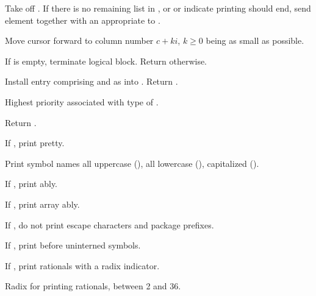\begin{LIST}{1cm}
  \begin{LIST}{.5cm}

    Take  off . If there is no remaining
    list in , or  or  indicate
    printing should end, send element together with an appropriate to
    . 

    Move cursor forward to column number $c + ki$, $k \geq 0$ being as small
    as possible.

    If  is empty, terminate logical block. Return
    \retval{\NIL} otherwise.

  \end{LIST}


  Install entry comprising  and  as
   into . Return \retval{\NIL}.

  Highest priority  associated with type of
  . 

  Return .

  If \T, print pretty.

  Print symbol names all uppercase (), all lowercase
  (), capitalized ().

  If \T, print ably.

  If \T, print array ably.

  If \NIL, do not print escape characters and package prefixes.

  If \T, print \kwd{:\#} before uninterned symbols.

  If \T, print rationals with a radix indicator.

  Radix for printing rationals, between 2 and 36.


\end{LIST}
